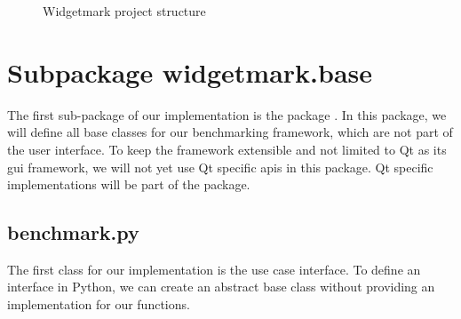 \begin{figure}[h]
    \centering
    \caption{Widgetmark project structure}
    \label{fig:application:implementation:structure}
\end{figure}





\section{Subpackage widgetmark.base}

The first sub-package of our implementation is the package
. In this package, we will define all base
classes for our benchmarking framework, which are not part of the user
interface. To keep the framework extensible and not limited to Qt as its
\gls{gui} framework, we will not yet use Qt specific \glspl{api} in this
package. Qt specific implementations will be part of the
 package.

\subsection{benchmark.py}

The first class for our implementation is the use case interface. To define an
interface in Python, we can create an abstract base class without providing an
implementation for our functions.


